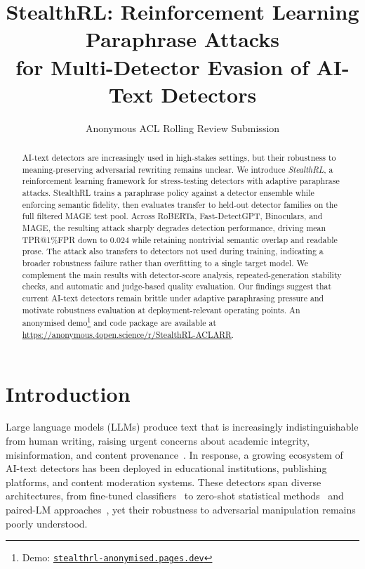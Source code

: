 \documentclass[11pt]{article}
\title{\textbf{StealthRL: Reinforcement Learning Paraphrase Attacks\\for Multi-Detector Evasion of AI-Text Detectors}}
\author{Anonymous ACL Rolling Review Submission}
\date{}
\begin{document}
\maketitle

\begin{abstract}
AI-text detectors are increasingly used in high-stakes settings, but their robustness to meaning-preserving adversarial rewriting remains unclear. We introduce \emph{StealthRL}, a reinforcement learning framework for stress-testing detectors with adaptive paraphrase attacks. StealthRL trains a paraphrase policy against a detector ensemble while enforcing semantic fidelity, then evaluates transfer to held-out detector families on the full filtered MAGE test pool. Across RoBERTa, Fast-DetectGPT, Binoculars, and MAGE, the resulting attack sharply degrades detection performance, driving mean TPR@1\%FPR down to 0.024 while retaining nontrivial semantic overlap and readable prose. The attack also transfers to detectors not used during training, indicating a broader robustness failure rather than overfitting to a single target model. We complement the main results with detector-score analysis, repeated-generation stability checks, and automatic and judge-based quality evaluation. Our findings suggest that current AI-text detectors remain brittle under adaptive paraphrasing pressure and motivate robustness evaluation at deployment-relevant operating points. An anonymised demo\footnote{Demo: \href{https://stealthrl-anonymised.pages.dev/}{\texttt{stealthrl-anonymised.pages.dev}}} and code package are available at \url{https://anonymous.4open.science/r/StealthRL-ACLARR}.
\end{abstract}

\section{Introduction}
\label{sec:intro}

Large language models (LLMs) produce text that is increasingly indistinguishable from human writing, raising urgent concerns about academic integrity, misinformation, and content provenance~\cite{solaiman2019release}. In response, a growing ecosystem of AI-text detectors has been deployed in educational institutions, publishing platforms, and content moderation systems. These detectors span diverse architectures, from fine-tuned classifiers~\cite{solaiman2019release} to zero-shot statistical methods~\cite{mitchell2023detectgptzeroshotmachinegeneratedtext, bao2024fastdetectgptefficientzeroshotdetection} and paired-LM approaches~\cite{hans2024spottingllmsbinocularszeroshot}, yet their robustness to adversarial manipulation remains poorly understood.
\end{document}
